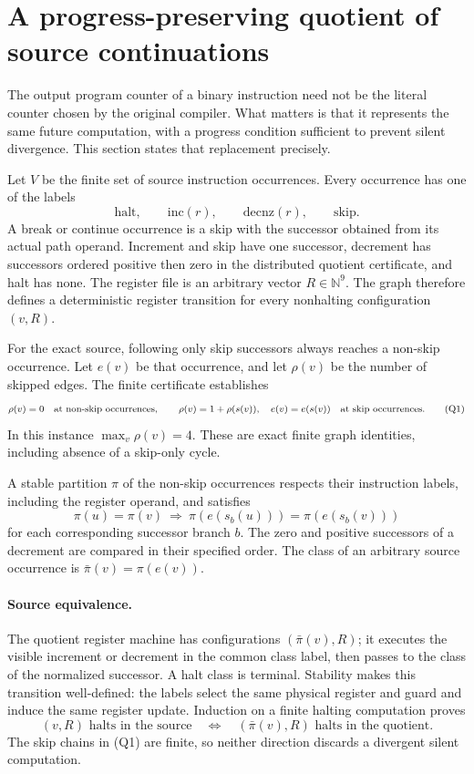 \section{A progress-preserving quotient of source continuations}
\label{sec:continuation-quotient}

The output program counter of a binary instruction need not be the literal
counter chosen by the original compiler. What matters is that it represents
the same future computation, with a progress condition sufficient to prevent
silent divergence. This section states that replacement precisely.

Let \(V\) be the finite set of source instruction occurrences. Every occurrence
has one of the labels
\[
  \mathrm{halt},\qquad \mathrm{inc}(r),\qquad
  \mathrm{decnz}(r),\qquad \mathrm{skip}.
\]
A break or continue occurrence is a skip with the successor obtained from its
actual path operand. Increment and skip have one successor, decrement has
successors ordered positive then zero in the distributed quotient certificate, and halt has none. The register file is
an arbitrary vector \(R\in\mathbb N^9\). The graph therefore defines a
deterministic register transition for every nonhalting configuration
\((v,R)\).

For the exact source, following only skip successors always reaches a
non-skip occurrence. Let \(e(v)\) be that occurrence, and let \(\rho(v)\) be
the number of skipped edges. The finite certificate establishes
\[
 \rho(v)=0\quad\hbox{at non-skip occurrences},\qquad
 \rho(v)=1+\rho(s(v)),\quad e(v)=e(s(v))
 \quad\hbox{at skip occurrences}.
 \tag{Q1}
\]
In this instance \(\max_v\rho(v)=4\). These are exact finite graph identities,
including absence of a skip-only cycle.

A stable partition \(\pi\) of the non-skip occurrences respects their
instruction labels, including the register operand, and satisfies
\[
 \pi(u)=\pi(v)
 \ \Longrightarrow\
 \pi(e(s_b(u)))=\pi(e(s_b(v)))
 \tag{Q2}
\]
for each corresponding successor branch \(b\). The zero and positive
successors of a decrement are compared in their specified order.
The class of an arbitrary source occurrence is
\(\bar\pi(v)=\pi(e(v))\).

\paragraph{Source equivalence.}
The quotient register machine has configurations
\((\bar\pi(v),R)\); it executes the visible increment or decrement in the
common class label, then passes to the class of the normalized successor.
A halt class is terminal. Stability makes this transition well-defined:
the labels select the same physical register and guard and induce the same
register update. Induction on a finite halting computation proves
\[
 (v,R)\text{ halts in the source}
 \quad\Longleftrightarrow\quad
 (\bar\pi(v),R)\text{ halts in the quotient}.
 \tag{Q3}
\]
The skip chains in (Q1) are finite, so neither direction discards a
divergent silent computation.

